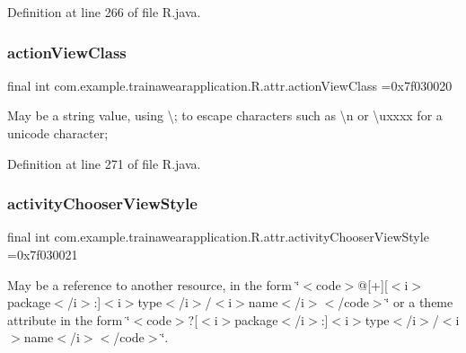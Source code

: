 Definition at line 266 of file R.\+java.

\mbox{\label{classcom_1_1example_1_1trainawearapplication_1_1_r_1_1attr_a38c265794b2c879a8743e90b59affd60}} 
\subsubsection{\texorpdfstring{actionViewClass}{actionViewClass}}
{\footnotesize\ttfamily final int com.\+example.\+trainawearapplication.\+R.\+attr.\+action\+View\+Class =0x7f030020\hspace{0.3cm}{\ttfamily [static]}}

May be a string value, using \textquotesingle{}\textbackslash{};\textquotesingle{} to escape characters such as \textquotesingle{}\textbackslash{}n\textquotesingle{} or \textquotesingle{}\textbackslash{}uxxxx\textquotesingle{} for a unicode character; 

Definition at line 271 of file R.\+java.

\mbox{\label{classcom_1_1example_1_1trainawearapplication_1_1_r_1_1attr_ac317500bc42aeb6cafff51366aea0580}} 
\subsubsection{\texorpdfstring{activityChooserViewStyle}{activityChooserViewStyle}}
{\footnotesize\ttfamily final int com.\+example.\+trainawearapplication.\+R.\+attr.\+activity\+Chooser\+View\+Style =0x7f030021\hspace{0.3cm}{\ttfamily [static]}}

May be a reference to another resource, in the form \char`\"{}$<$code$>$@\mbox{[}+\mbox{]}\mbox{[}$<$i$>$package$<$/i$>$\+:\mbox{]}$<$i$>$type$<$/i$>$/$<$i$>$name$<$/i$>$$<$/code$>$\char`\"{} or a theme attribute in the form \char`\"{}$<$code$>$?\mbox{[}$<$i$>$package$<$/i$>$\+:\mbox{]}$<$i$>$type$<$/i$>$/$<$i$>$name$<$/i$>$$<$/code$>$\char`\"{}. 

